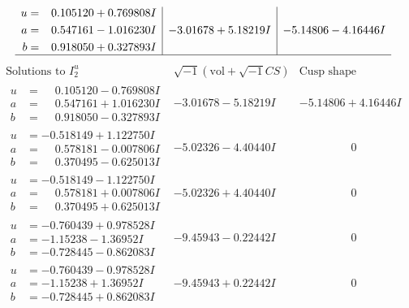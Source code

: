 \documentclass[1p]{elsarticle_modified}
\theoremstyle{definition}
\newcommand{\I}{\sqrt{-1}}
\begin{document}
$$\begin{array}{c|c|c}
\begin{aligned}
u &= \phantom{-}0.105120 + 0.769808 I \\
a &= \phantom{-}0.547161 - 1.016230 I \\
b &= \phantom{-}0.918050 + 0.327893 I\end{aligned}
 & -3.01678 + 5.18219 I & -5.14806 - 4.16446 I\\
 \hline 
 \end{array}$$\newpage$$\begin{array}{c|c|c}  
\text{Solutions to }I^u_{2}& \I (\text{vol} + \sqrt{-1}CS) & \text{Cusp shape}\\
 \hline 
\begin{aligned}
u &= \phantom{-}0.105120 - 0.769808 I \\
a &= \phantom{-}0.547161 + 1.016230 I \\
b &= \phantom{-}0.918050 - 0.327893 I\end{aligned}
 & -3.01678 - 5.18219 I & -5.14806 + 4.16446 I \\ \hline\begin{aligned}
u &= -0.518149 + 1.122750 I \\
a &= \phantom{-}0.578181 - 0.007806 I \\
b &= \phantom{-}0.370495 - 0.625013 I\end{aligned}
 & -5.02326 - 4.40440 I & \phantom{-0.000000 } 0 \\ \hline\begin{aligned}
u &= -0.518149 - 1.122750 I \\
a &= \phantom{-}0.578181 + 0.007806 I \\
b &= \phantom{-}0.370495 + 0.625013 I\end{aligned}
 & -5.02326 + 4.40440 I & \phantom{-0.000000 } 0 \\ \hline\begin{aligned}
u &= -0.760439 + 0.978528 I \\
a &= -1.15238 - 1.36952 I \\
b &= -0.728445 - 0.862083 I\end{aligned}
 & -9.45943 - 0.22442 I & \phantom{-0.000000 } 0 \\ \hline\begin{aligned}
u &= -0.760439 - 0.978528 I \\
a &= -1.15238 + 1.36952 I \\
b &= -0.728445 + 0.862083 I\end{aligned}
 & -9.45943 + 0.22442 I & \phantom{-0.000000 } 0 \\ \hline\begin{aligned}

\end{aligned}
\end{array}$$
\end{document}
